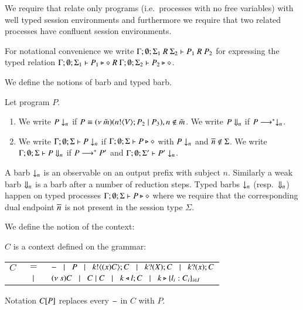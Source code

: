We require that relate only programs (i.e.\ processes with no free variables) with
well typed session environments and furthermore we require that two related processes
have confluent session environments.

For notational convenience we write $\Gamma; \emptyset; \Sigma_1\ R\ \Sigma_2 \vdash P_1\ R\ P_2$
for expressing the typed relation $\Gamma; \emptyset; \Sigma_1 \vdash P_1 \triangleright \diamond\ R\ \Gamma; \emptyset; \Sigma_2 \vdash P_2 \triangleright \diamond$.

We define the notions of barb and typed barb.

\begin{definition}[Barbs]\rm
	Let program $P$.
	\begin{enumerate}
		\item	We write $P \downarrow_{n}$ if $P \equiv (\nu\ \tilde{m})(n ! \langle V \rangle ; P_2 \;|\; P_3), n \notin \tilde{m}$.
			We write $P \Downarrow_{n}$ if $P \longrightarrow^* \downarrow_{n}$.

		\item	We write $\Gamma; \emptyset; \Sigma \vdash P \downarrow_{n}$ if
			$\Gamma; \emptyset; \Sigma \vdash P \triangleright \diamond$ with $P \downarrow_{n}$ and $\overline{n} \notin \Sigma$.
			We write $\Gamma; \emptyset; \Sigma \vdash P \Downarrow_{n}$ if $P \longrightarrow^* P'$ and
			$\Gamma; \emptyset; \Sigma' \vdash P' \downarrow_{n}$.			
	\end{enumerate}
\end{definition}

A barb $\downarrow_{n}$ is an observable on an output prefix with subject $n$.
Similarly a weak barb $\Downarrow_{n}$ is a barb after a number of reduction steps.
Typed barbs $\downarrow_{n}$ (resp.\ $\Downarrow_{n}$)
happen on typed processes $\Gamma; \emptyset; \Sigma \vdash P \triangleright \diamond$
where we require that the corresponding dual endpoint $\overline{n}$ is not present
in the session type $\Sigma$.

We define the notion of the context:

\begin{definition}[Context]\rm
	$C$ is a context defined on the grammar:

	\begin{tabular}{rcl}
		$C$ &$=$& %
		$- \;\;\;|\;\;\; P \;\;\;|\;\;\; k ! \langle (x) C \rangle ; C \;\;\;|\;\;\; k ? (X) ; C \;\;\;|\;\;\; k ? (x) ; C$ \\
		& $\;\;\;|\;\;\;$ & $(\nu\ s) C \;\;\;|\;\;\; C \;|\; C \;\;\;|\;\;\; k \triangleleft l ; C \;\;\;|\;\;\; k \triangleright \{l_i:C_i\}_{i \in I}$
	\end{tabular}

	Notation $C[P]$ replaces every $-$ in $C$ with $P$.
\end{definition}

